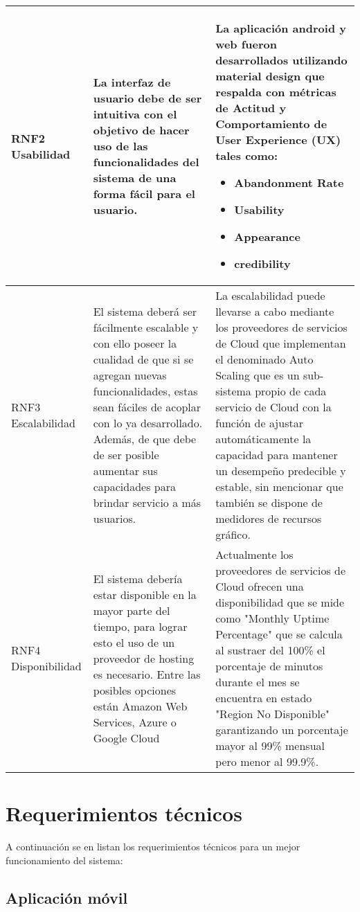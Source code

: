 \begin{center}
\begin{tabularx}{1.0\textwidth} { 
 			| >{\raggedright\arraybackslash}X 
 			| >{\arraybackslash}X 
 			| >{\raggedright\arraybackslash}X | }
 		\hline
 		RNF2 Usabilidad  & La interfaz de usuario debe de ser intuitiva con el objetivo de hacer uso de las funcionalidades del sistema de una forma fácil para el usuario.  & La aplicación android y web fueron desarrollados utilizando material design que respalda con métricas de Actitud y Comportamiento de User Experience (UX) tales como:
 		\begin{itemize}
 			\item Abandonment Rate
 			\item Usability
 			\item Appearance
 			\item credibility
 		\end{itemize}  \\
 		\hline
 		RNF3 Escalabilidad  &   El sistema deberá ser fácilmente escalable y con ello poseer la cualidad de que si se agregan nuevas funcionalidades, estas sean fáciles de acoplar con lo ya desarrollado. Además, de que debe de ser posible aumentar sus capacidades para brindar servicio a más usuarios.
 		& La escalabilidad puede llevarse a cabo mediante los proveedores de servicios de Cloud que implementan el denominado Auto Scaling que es un sub-sistema propio de cada servicio de Cloud con la función de ajustar automáticamente la capacidad para mantener un desempeño predecible y estable, sin mencionar que también se dispone de medidores de recursos gráfico.  \\
 		\hline
 		RNF4 Disponibilidad  &   El sistema debería estar disponible en la mayor parte del tiempo, para lograr esto el uso de un proveedor de hosting es necesario. Entre las posibles opciones están Amazon Web Services, Azure o Google Cloud
 		&   Actualmente los proveedores de servicios de Cloud ofrecen una disponibilidad que se mide como "Monthly Uptime Percentage" que se calcula al sustraer del 100\% el porcentaje de minutos durante el mes se encuentra en estado "Region No Disponible" garantizando un porcentaje mayor al 99\% mensual pero menor al 99.9\%. \\
 		\hline
 	\end{tabularx}
 \end{center}
 
            
\section{Requerimientos técnicos}
    A continuación se en listan los requerimientos técnicos para un mejor funcionamiento del sistema:
    \subsection{Aplicación móvil}
